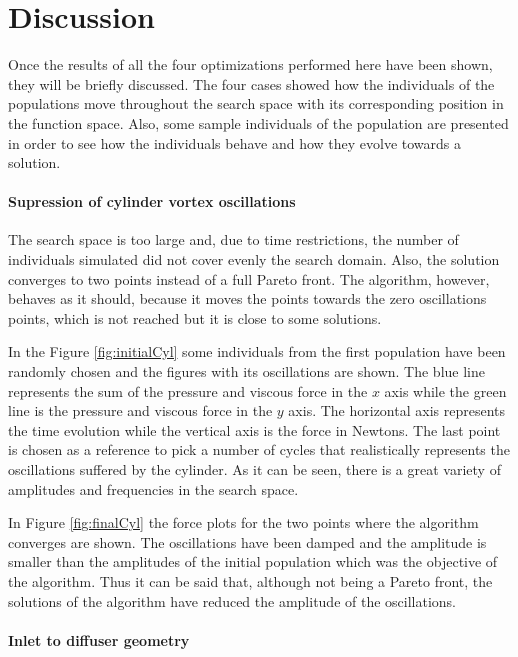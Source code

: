 \chapter{Discussion}

Once the results of all the four optimizations performed here have been shown, they will be briefly discussed. The four cases showed how the individuals of the populations move throughout the search space with its corresponding position in the function space. Also, some sample individuals of the population are presented in order to see how the individuals behave and how they evolve towards a solution. 

\subsubsection*{Supression of cylinder vortex oscillations}

The search space is too large and, due to time restrictions, the number of individuals simulated did not cover evenly the search domain. Also, the solution converges to two points instead of a full Pareto front. The algorithm, however, behaves as it should, because it moves the points towards the zero oscillations points, which is not reached but it is close to some solutions. 

In the Figure \ref{fig:initialCyl} some individuals from the first population have been randomly chosen and the figures with its oscillations are shown. The blue line represents the sum of the pressure and viscous force in the $x$ axis while the green line is the pressure and viscous force in the $y$ axis. The horizontal axis represents the time evolution while the vertical axis is the force in Newtons. The last point is chosen as a reference to pick a number of cycles that realistically represents the oscillations suffered by the cylinder. As it can be seen, there is a great variety of amplitudes and frequencies in the search space.

In Figure \ref{fig:finalCyl} the force plots for the two points where the algorithm converges are shown. The oscillations have been damped and the amplitude is smaller than the amplitudes of the initial population which was the objective of the algorithm. Thus it can be said that, although not being a Pareto front, the solutions of the algorithm have reduced the amplitude of the oscillations. 

\subsubsection*{Inlet to diffuser geometry}


